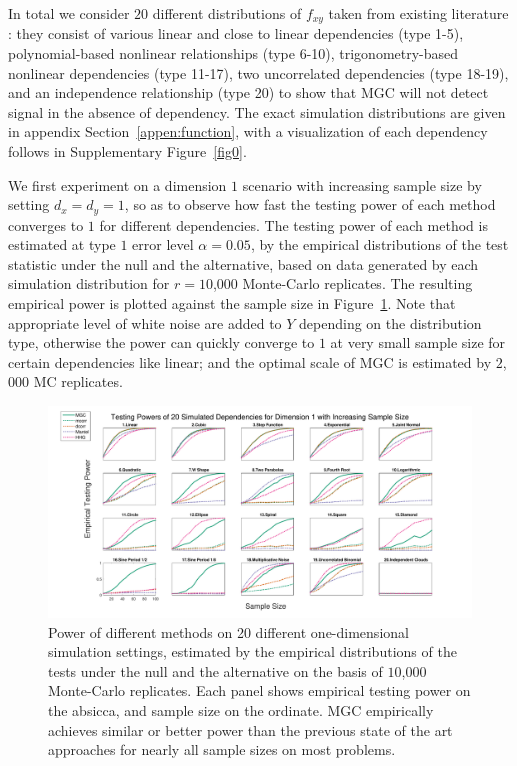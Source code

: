 \documentclass[11pt]{article}
\begin{document}

In total we consider $20$ different distributions of $f_{xy}$ taken from existing literature \cite{SzekelyRizzoBakirov2007, SimonTibshirani2012, GorfineHellerHeller2012, HellerGorfine2013}: they consist of various linear and close to linear dependencies (type 1-5), polynomial-based nonlinear relationships (type 6-10), trigonometry-based nonlinear dependencies (type 11-17), two uncorrelated dependencies (type 18-19), and an independence relationship (type 20) to show that MGC will not detect signal in the absence of dependency. The exact simulation distributions are given in appendix Section~\ref{appen:function}, with a visualization of each dependency follows in Supplementary Figure~\ref{fig0}.

We first experiment on a dimension $1$ scenario with increasing sample size by setting $d_{x}=d_{y}=1$, so as to observe how fast the testing power of each method converges to $1$ for different dependencies. The testing power of each method is estimated at type $1$ error level $\alpha=0.05$, by the empirical distributions of the test statistic under the null and the alternative, based on data generated by each simulation distribution for $r=10$,$000$ Monte-Carlo replicates. The resulting empirical power is plotted against the sample size in Figure~\ref{fig:1D}. Note that appropriate level of white noise are added to $Y$ depending on the distribution type, otherwise the power can quickly converge to $1$ at very small sample size for certain dependencies like linear; and the optimal scale of MGC is estimated by $2$,$000$ MC replicates.

\begin{figure}[htbp]
\includegraphics[width=1.0\textwidth]{../Figures/Fig1}
\caption{
Power of different methods on 20 different one-dimensional simulation settings, estimated by the empirical distributions of the tests under the null and the alternative on the basis of $10$,$000$ Monte-Carlo replicates.
Each panel shows empirical testing power on the absicca, and sample size on the ordinate.
MGC empirically achieves similar or better power than the previous state of the art approaches for nearly all sample sizes on most problems.}
\label{fig:1D}
\end{figure}
\end{document}
